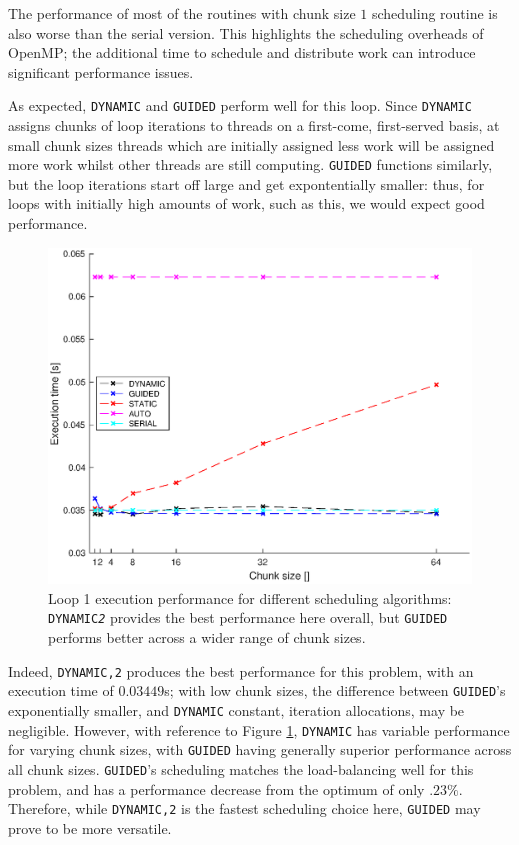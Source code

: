 \documentclass{article} %
\newcommand{\tp}{\texttt}
\begin{document}
The performance of most of the routines with chunk size $1$ scheduling routine is also worse than the serial version. This highlights the scheduling overheads of OpenMP; the additional time to schedule and distribute work can introduce significant performance issues.

As expected, \tp{DYNAMIC} and \tp{GUIDED} perform well for this loop.
Since \tp{DYNAMIC} assigns chunks of loop iterations to threads on a first-come, first-served basis, at small chunk sizes threads which are initially assigned less work will be assigned more work whilst other threads are still computing. 
\tp{GUIDED} functions similarly, but the loop iterations start off large and get expontentially smaller: thus, for loops with initially high amounts of work, such as this, we would expect good performance.

\begin{figure}
    \centering
    \includegraphics[height=.35\textheight]{part1_plots/all_part1.eps}
    \caption{Loop 1 execution performance for different scheduling algorithms: \tp{DYNAMIC\textit{2}} provides the best performance here overall, but \tp{GUIDED} performs better across a wider range of chunk sizes.}
    \label{fig:loop1results}
\end{figure}

Indeed, \tp{DYNAMIC,2} produces the best performance for this problem, with an execution time of $0.03449$s; with low chunk sizes, the difference between \tp{GUIDED}'s exponentially smaller, and \tp{DYNAMIC} constant, iteration allocations, may be negligible.
However, with reference to Figure \ref{fig:loop1results}, \tp{DYNAMIC} has variable performance for varying chunk sizes, with \tp{GUIDED} having generally superior performance across all chunk sizes.
\tp{GUIDED}'s scheduling matches the load-balancing well for this problem, and has a performance decrease from the optimum of only $.23\%$.
Therefore, while \tp{DYNAMIC,2} is the fastest scheduling choice here, \tp{GUIDED} may prove to be more versatile.
\end{document}
